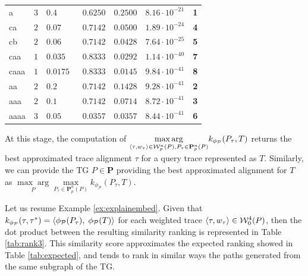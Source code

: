 \begin{table}[!t]
\begin{tabular}{lc|ll|cc|l}
	\midrule
	{a}  & $3$ & $0.4$ & $\;\; 0.6250$  & $0.2500$ & $8.16\cdot 10^{-21}$ & \textbf{\color{blue}1}\\
	{ca}  & $2$ & $0.07$ & $\;\; 0.7142$ & $0.0500$ & $1.89\cdot 10^{-24}$ & \textbf{\color{blue}4}\\
	{cb}  & $2$ & $0.06$ & $\;\; 0.7142$ & $0.0428$ & $7.64\cdot 10^{-25}$ & \textbf{\color{blue}5}\\
	{caa}  & $1$ & $0.035$ & $\;\; 0.8333$ & $0.0292$ & $1.14\cdot 10^{-40}$ & \textbf{\color{blue}7}\\
	{caaa}  & $1$  & $0.0175$ & $\;\; 0.8333$ & $0.0145$ & $9.84\cdot 10^{-41}$ & \textbf{\color{blue}8}\\
	{aa}  & $2$ & $0.2$ & $\;\; 0.7142$ & $0.1428$ & $9.28\cdot 10^{-41}$ & \textbf{\color{red}2}\\
	{aaa}  & $2$ & $0.1$ & $\;\; 0.7142$ & $0.0714$ & $8.72\cdot 10^{-41}$ & \textbf{\color{red}3}\\
	{aaaa}  & $3$ & $0.05$ & $\;\; 0.0357$ & $0.0357$ & $8.44\cdot 10^{-41}$ & \textbf{\color{red}6}\\
	\bottomrule
\end{tabular}
\end{table}


At this stage, the computation of $\underset{\braket{\tau,w_\tau}\in \mathcal{W}_p^n(P), P_\tau\in\mathbf{P}_p^n(P)}{\max\arg} k_{\phi_\mathcal{P}}(P_\tau, T)$ returns the best approximated trace alignment $\tau$ for a query trace represented as $T$. Similarly, we can provide the TG $P\in\mathbf{P}$ providing the best approximated alignment for $T$ as $\underset{P}{\max\arg}\underset{ P_\tau\in\mathbf{P}_p^n(P)}{\max} k_{\phi_\mathcal{P}}(P_\tau, T)$. 

\begin{example}
	Let us resume Example \ref{ex:explainembed}. 
	Given that $k_{\phi_{\mathcal{P}}}(\tau,\tau^*)=\braket{\phi_{\mathcal{P}}(P_\tau),\;\phi_{\mathcal{P}}(T)}$ for each weighted trace $\braket{\tau,w_\tau}\in\mathcal{W}_0^4(P)$, then the dot product between the resulting similarity ranking is represented in Table \ref{tab:rank3}. This similarity score approximates the expected ranking showed in Table \ref{tab:expected}, and tends to rank in similar ways the paths generated from the same subgraph of the TG.
\end{example}


